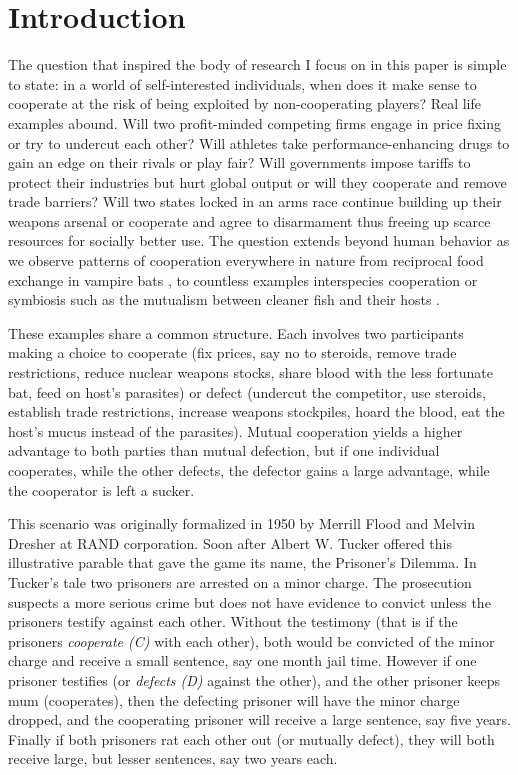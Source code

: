 

\chapter{Introduction}
The question that inspired the body of research I focus on in this paper is simple to state: in a world of self-interested individuals, when does it make sense to cooperate at the risk of being exploited by non-cooperating players? Real life examples abound. Will two profit-minded competing firms engage in price fixing or try to undercut each other? Will athletes take performance-enhancing drugs to gain an edge on their rivals or play fair? Will governments impose tariffs to protect their industries but hurt global output or will they cooperate and remove trade barriers? Will two states locked in an arms race continue building up their weapons arsenal or cooperate and agree to disarmament thus freeing up scarce resources for socially better use.
The question extends beyond human behavior as we observe patterns of cooperation everywhere in nature from reciprocal food exchange in vampire bats \cite{Wilkinson_1984}, to countless examples interspecies cooperation or symbiosis such as the mutualism between cleaner fish and their hosts \cite{Bshary_2002}.

These examples share a common structure. Each involves two participants making a choice to cooperate (fix prices, say no to steroids, remove trade restrictions, reduce nuclear weapons stocks, share blood with the less fortunate bat, feed on host's parasites) or defect (undercut the competitor, use steroids, establish trade restrictions, increase weapons stockpiles, hoard the blood, eat the host's mucus instead of the parasites). Mutual cooperation yields a higher advantage to both parties than mutual defection, but if one individual cooperates, while the other defects, the defector gains a large advantage, while the cooperator is left a sucker.

This scenario was originally formalized in 1950 by Merrill Flood and Melvin Dresher at RAND corporation. Soon after Albert W. Tucker offered this illustrative parable that gave the game its name, the Prisoner's Dilemma. In Tucker's tale two prisoners are arrested on a minor charge. The prosecution suspects a more serious crime but does not have evidence to convict unless the prisoners testify against each other. Without the testimony (that is if the prisoners \textit{cooperate (C)} with each other), both would be convicted of the minor charge and receive a small sentence, say one month jail time. However if one prisoner testifies (or \textit{defects (D)} against the other), and the other prisoner keeps mum (cooperates), then the defecting prisoner will have the minor charge dropped, and the cooperating prisoner will receive a large sentence, say five years. Finally if both prisoners rat each other out (or mutually defect), they will both receive large, but lesser sentences, say two years each.


